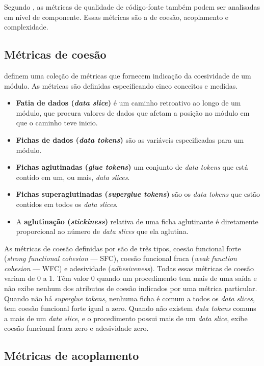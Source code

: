 Segundo , as métricas de qualidade de código-fonte também podem ser analisadas em nível de componente. Essas métricas são a de coesão, acoplamento e complexidade.

\subsection{Métricas de coesão}

 definem uma coleção de métricas que fornecem indicação da coesividade de um módulo. As métricas são definidas especificando cinco conceitos e medidas.

\begin{itemize}
	\item\textbf{Fatia de dados (\textit{data slice})} é um caminho retroativo ao longo de um módulo, que procura valores de dados que afetam a posição no módulo em que o caminho teve inicio.
	\item\textbf{Fichas de dados (\textit{data tokens})} são as variáveis especificadas para um módulo.
	\item\textbf{Fichas aglutinadas (\textit{glue tokens})} um conjunto de \textit{data tokens} que está contido em um, ou mais, \textit{data slices}.
	\item\textbf{Fichas superaglutinadas (\textit{superglue tokens})} são os \textit{data tokens} que estão contidos em todos os \textit{data slices}.
	\item A \textbf{aglutinação (\textit{stickiness})} relativa de uma ficha aglutinante é diretamente proporcional ao número de \textit{data slices} que ela aglutina.
\end{itemize}

As métricas de coesão definidas por  são de três tipos, coesão funcional forte (\textit{strong functional cohesion} --- SFC), coesão funcional fraca (\textit{weak function cohesion} --- WFC) e adesividade (\textit{adhesiveness}). 
Todas essas métricas de coesão variam de 0 a 1. Têm valor 0 quando um procedimento tem mais de uma saída e não exibe nenhum dos atributos de coesão indicados por uma métrica particular. Quando não há \textit{superglue tokens}, nenhuma ficha é comum a todos os \textit{data slices}, tem coesão funcional forte igual a zero. Quando não existem \textit{data tokens} comuns a mais de um \textit{data slice}, e o procedimento possui mais de um \textit{data slice}, exibe coesão funcional fraca zero e adesividade zero.

\subsection{Métricas de acoplamento}

